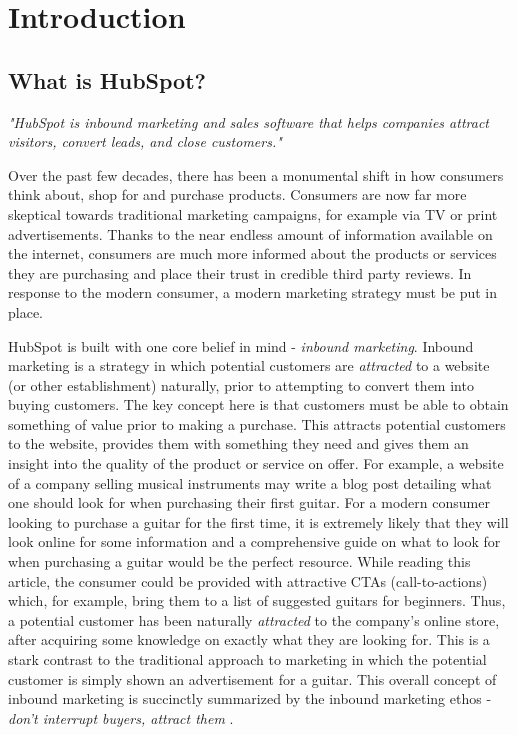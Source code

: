 \chapter{Introduction}

\section{What is HubSpot?}
\textit{"HubSpot is inbound marketing and sales software that helps companies attract visitors, convert leads, and close customers."} \cite{whatIsHubSpot}\hfill\break

Over the past few decades, there has been a monumental shift in how consumers think about, shop for and purchase products. Consumers are now far more skeptical towards traditional marketing campaigns, for example via TV or print advertisements. Thanks to the near endless amount of information available on the internet, consumers are much more informed about the products or services they are purchasing and place their trust in credible third party reviews. In response to the modern consumer, a modern marketing strategy must be put in place. 

HubSpot is built with one core belief in mind - \textit{inbound marketing}. Inbound marketing is a strategy in which potential customers are \textit{attracted} to a website (or other establishment) naturally, prior to attempting to convert them into buying customers. The key concept here is that customers must be able to obtain something of value prior to making a purchase. This attracts potential customers to the website, provides them with something they need and gives them an insight into the quality of the product or service on offer. For example, a website of a company selling musical instruments may write a blog post detailing what one should look for when purchasing their first guitar. For a modern consumer looking to purchase a guitar for the first time, it is extremely likely that they will look online for some information and a comprehensive guide on what to look for when purchasing a guitar would be the perfect resource. While reading this article, the consumer could be provided with attractive CTAs (call-to-actions) which, for example, bring them to a list of suggested guitars for beginners. Thus, a potential customer has been naturally \textit{attracted} to the company's online store, after acquiring some knowledge on exactly what they are looking for. This is a stark contrast to the traditional approach to marketing in which the potential customer is simply shown an advertisement for a guitar. This overall concept of inbound marketing is succinctly summarized by the inbound marketing ethos - \textit{don't interrupt buyers, attract them} \cite{whatIsHubSpot}.

